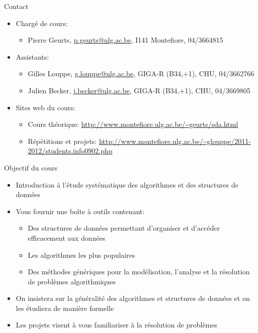 
\begin{frame}{Contact}
\begin{itemize}
\item Chargé de cours:
\begin{itemize}
\item Pierre Geurts, \url{p.geurts@ulg.ac.be}, I141 Montefiore, 04/3664815
\end{itemize}
\item Assistants:
\begin{itemize}
\item Gilles Louppe, \url{g.louppe@ulg.ac.be}, GIGA-R (B34,+1), CHU, 04/3662766
\item Julien Becker, \url{j.becker@ulg.ac.be}, GIGA-R (B34,+1), CHU, 04/3669805
\end{itemize}
\item Sites web du cours:
\begin{itemize}
\item Cours théorique: \url{http://www.montefiore.ulg.ac.be/~geurts/sda.html}
\item Répétitions et projets: \url{http://www.montefiore.ulg.ac.be/~glouppe/2011-2012/students.info0902.php}
\end{itemize}
\end{itemize}
\end{frame}

\begin{frame}{Objectif du cours}

\begin{itemize}
\item Introduction à l'étude systématique des algorithmes et des
  structures de données
\item Vous fournir une boîte à outils contenant:
\begin{itemize}
\item Des structures de données permettant d'organiser et d'accéder efficacement
  aux données
\item Les algorithmes les plus populaires
\item Des méthodes génériques pour la modélisation, l'analyse et la résolution de problèmes algorithmiques
\end{itemize}
\item On insistera sur la généralité des algorithmes et structures de données et on les étudiera de manière formelle
\item Les projets visent à vous familiariser à la résolution de problèmes
\end{itemize}

\end{frame}

